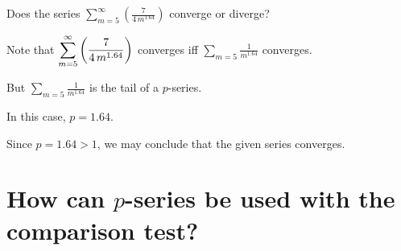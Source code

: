 \documentclass{ximera}
\begin{document}
\begin{question}
  Does the series \(\displaystyle\sum_{m=5}^\infty \left( \displaystyle\frac{7}{4 \, m^{1.64}} \right)\) converge or diverge?
  
  \begin{solution}
    \begin{hint}
      Note that \(\displaystyle\displaystyle\sum_{m=5}^\infty \left( \displaystyle\frac{7}{4 \, m^{1.64}} \right)\) converges iff \(\displaystyle\sum_{m=5} \displaystyle\frac{1}{m^{1.64}}\) converges.
    \end{hint}
    \begin{hint}
      But \(\displaystyle\sum_{m=5} \displaystyle\frac{1}{m^{1.64}}\) is the tail of a \(p\)-series.
    \end{hint}
    \begin{hint}
      In this case, \(p = 1.64\).
    \end{hint}
    \begin{hint}
      Since \(p = 1.64 > 1\), we may conclude that the given series converges.
    \end{hint}


    \begin{multiple-choice}
    \end{multiple-choice}

  \end{solution}
\end{question}
            

\section{How can \(p\)-series be used with the comparison test?}
\end{document}
